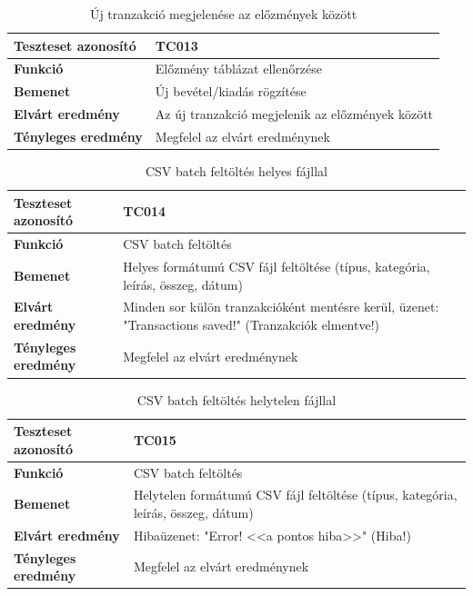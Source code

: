 \begin{table}[h!]
	\centering
	\begin{tabular}{|l|p{10cm}|}
		\hline
		\textbf{Teszteset azonosító} & TC013 \\ \hline
		\textbf{Funkció} & Előzmény táblázat ellenőrzése \\ \hline
		\textbf{Bemenet} & Új bevétel/kiadás rögzítése \\ \hline
		\textbf{Elvárt eredmény} & Az új tranzakció megjelenik az előzmények között \\ \hline
		\textbf{Tényleges eredmény} & Megfelel az elvárt eredménynek \\ \hline
	\end{tabular}
	\caption{Új tranzakció megjelenése az előzmények között}
	\label{tab:elozmeny_tabla}
\end{table}

\begin{table}[h!]
	\centering
	\begin{tabular}{|l|p{10cm}|}
		\hline
		\textbf{Teszteset azonosító} & TC014 \\ \hline
		\textbf{Funkció} & CSV batch feltöltés \\ \hline
		\textbf{Bemenet} & Helyes formátumú CSV fájl feltöltése (típus, kategória, leírás, összeg, dátum) \\ \hline
		\textbf{Elvárt eredmény} & Minden sor külön tranzakcióként mentésre kerül, üzenet: "Transactions saved!" (Tranzakciók elmentve!) \\ \hline
		\textbf{Tényleges eredmény} & Megfelel az elvárt eredménynek \\ \hline
	\end{tabular}
	\caption{CSV batch feltöltés helyes fájllal}
	\label{tab:csv_feltoltes}
\end{table}

\begin{table}[h!]
	\centering
	\begin{tabular}{|l|p{10cm}|}
		\hline
		\textbf{Teszteset azonosító} & TC015 \\ \hline
		\textbf{Funkció} & CSV batch feltöltés \\ \hline
		\textbf{Bemenet} & Helytelen formátumú CSV fájl feltöltése (típus, kategória, leírás, összeg, dátum) \\ \hline
		\textbf{Elvárt eredmény} & Hibaüzenet: "Error! <<a pontos hiba>>" (Hiba!) \\ \hline
		\textbf{Tényleges eredmény} & Megfelel az elvárt eredménynek \\ \hline
	\end{tabular}
	\caption{CSV batch feltöltés helytelen fájllal}
	\label{tab:csv_feltoltes_helytelen}
\end{table}

